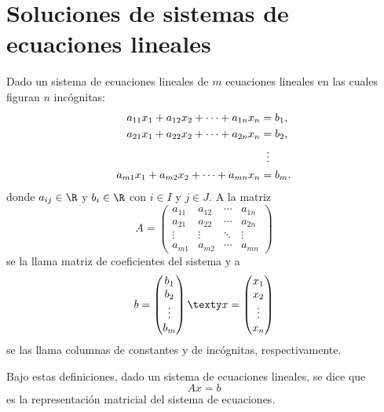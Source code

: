 \documentclass[a4,11pt]{aleph-notas}
\begin{document}
\section{Soluciones de sistemas de ecuaciones lineales}
\begin{defi}
    Dado un sistema de ecuaciones lineales de $m$ ecuaciones lineales en las cuales figuran $n$ incógnitas:
    \begin{align*}
        a_{11}x_1 + a_{12}x_2 + \cdots + a_{1n}x_n &= b_1,\\
        a_{21}x_1 + a_{22}x_2 + \cdots + a_{2n}x_n &= b_2,\\
            & \hspace{2mm} \vdots\\
        a_{m1}x_1 + a_{m2}x_2 + \cdots + a_{mn}x_n &= b_m.
    \end{align*}
    donde $a_{ij}\in\R$ y $b_i\in \R$ con $i\in I$ y $j\in J$. A la matriz
    \[
        A=\begin{pmatrix}
        a_{11} & a_{12} & \cdots & a_{1n}\\
        a_{21} & a_{22} & \cdots & a_{2n}\\
        \vdots & \vdots & \ddots & \vdots\\
        a_{m1} & a_{m2} & \cdots & a_{mn}
        \end{pmatrix}
    \]
    se la llama matriz de coeficientes del sistema y a 
    \[
        b=\begin{pmatrix}
        b_1 \\ b_2 \\ \vdots \\ b_m
        \end{pmatrix}
        \texty
        x=\begin{pmatrix}
        x_1 \\ x_2 \\ \vdots \\ x_n
        \end{pmatrix}
    \]
    se las llama columnas de constantes y de incógnitas, respectivamente.
\end{defi}

\begin{advertencia}
    Bajo estas definiciones, dado un sistema de ecuaciones lineales, se dice que
    \[
        Ax=b
    \]
    es la representación matricial del sistema de ecuaciones.
\end{advertencia}
\end{document}
